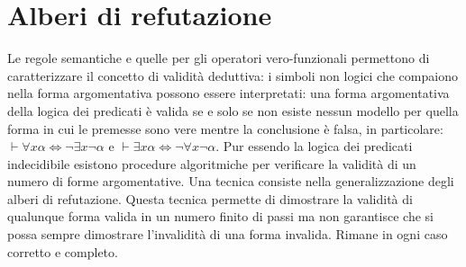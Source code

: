 \section{Alberi di refutazione}
Le regole semantiche e quelle per gli operatori vero-funzionali permettono di caratterizzare il concetto di validit\`a deduttiva: i simboli non logici che compaiono nella forma argomentativa possono essere 
interpretati: una forma argomentativa della logica dei predicati \`e valida se e solo se non esiste nessun modello per quella forma in cui le premesse sono vere mentre la conclusione \`e falsa, in particolare: $
\vdash\forall x\alpha\Leftrightarrow\neg\exists x\neg\alpha$ e $\vdash\exists x\alpha\Leftrightarrow\neg\forall x\neg\alpha$. Pur essendo la logica dei predicati indecidibile esistono procedure algoritmiche 
per verificare la validit\`a di un numero di forme argomentative. Una tecnica consiste nella generalizzazione degli alberi di refutazione. Questa tecnica permette di dimostrare la validit\`a di qualunque forma 
valida in un numero finito di passi ma non garantisce che si possa sempre dimostrare l'invalidit\`a di una forma invalida. Rimane in ogni caso corretto e completo. 
